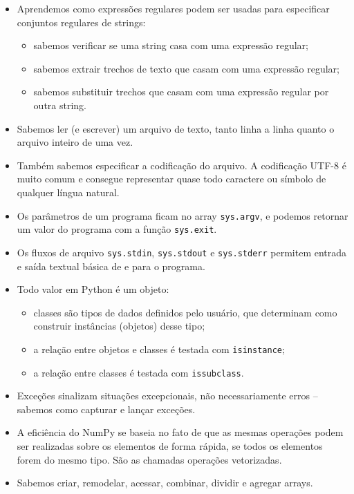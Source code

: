 \documentclass[11pt,a4paper]{article}
\begin{document}
\begin{itemize}
\item Aprendemos como expressões regulares podem ser usadas para
  especificar conjuntos regulares de strings:
  \begin{itemize}
  \item sabemos verificar se uma string casa com uma expressão regular;
  \item sabemos extrair trechos de texto que casam com uma expressão
    regular;
  \item sabemos substituir trechos que casam com uma expressão regular
    por outra string.
  \end{itemize}
\item Sabemos ler (e escrever) um arquivo de texto, tanto linha a linha
  quanto o arquivo inteiro de uma vez.
\item Também sabemos especificar a codificação do arquivo. A codificação
  UTF-8 é muito comum e consegue representar quase todo caractere ou
  símbolo de qualquer língua natural.
\item Os parâmetros de um programa ficam no array \texttt{sys.argv}, e
  podemos retornar um valor do programa com a função \texttt{sys.exit}.
\item Os fluxos de arquivo \texttt{sys.stdin}, \texttt{sys.stdout} e
  \texttt{sys.stderr} permitem entrada e saída textual básica de e para
  o programa.
\item Todo valor em Python é um objeto:
  \begin{itemize}
  \item classes são tipos de dados definidos pelo usuário, que
    determinam como construir instâncias (objetos) desse tipo;
  \item a relação entre objetos e classes é testada com
    \texttt{isinstance};
  \item a relação entre classes é testada com \texttt{issubclass}.
  \end{itemize}
\item Exceções sinalizam situações excepcionais, não necessariamente
  erros -- sabemos como capturar e lançar exceções.
\item A eficiência do NumPy se baseia no fato de que as mesmas operações
  podem ser realizadas sobre os elementos de forma rápida, se todos os
  elementos forem do mesmo tipo. São as chamadas operações vetorizadas.
\item Sabemos criar, remodelar, acessar, combinar, dividir e agregar
  arrays.
\end{itemize}
\end{document}
